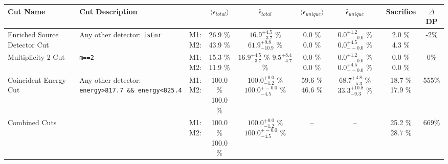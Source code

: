 \small
\begin{tabular}{|>{\raggedright}m{3cm}|m{6cm}|c c c|c c|c|c|}
\hline
  Cut Name & Cut Description &   & $\langle\epsilon_{total}\rangle$ & $\hat{\epsilon}_{total}$ & $\langle\epsilon_{unique}\rangle$ & $\hat{\epsilon}_{unique}$ & Sacrifice & $\Delta$DP \\
\hline
  Enriched Source Detector Cut & \tiny Any other detector: \texttt{isEnr} & \makecell{M1: \\ M2:} & \makecell{26.9 \% \\ 43.9 \%} & \makecell{$16.9^{+4.5}_{-3.7}$ \% \\ $61.9^{+9.8}_{-10.9}$ \%} & \makecell{0.0 \% \\ 0.0 \%} & \makecell{$0.0^{+1.2}_{--0.0}$ \% \\ $0.0^{+4.5}_{--0.0}$ \%} & \makecell{2.0 \% \\ 4.3 \%} & -2\% \\
  Multiplicity 2 Cut & \tiny  \texttt{m==2} & \makecell{M1: \\ M2:} & \makecell{15.3 \% \\ 11.9 \%} & \makecell{$16.9^{+4.5}_{-3.7}$ \% \\ $9.5^{+8.4}_{-4.7}$ \%} & \makecell{0.0 \% \\ 0.0 \%} & \makecell{$0.0^{+1.2}_{--0.0}$ \% \\ $0.0^{+4.5}_{--0.0}$ \%} & \makecell{0.0 \% \\ 0.0 \%} & 0\% \\
  Coincident Energy Cut & \tiny Any other detector: \texttt{energy>817.7 \&\& energy<825.4} & \makecell{M1: \\ M2:} & \makecell{100.0 \% \\ 100.0 \%} & \makecell{$100.0^{+0.0}_{-1.2}$ \% \\ $100.0^{+-0.0}_{-4.5}$ \%} & \makecell{59.6 \% \\ 46.6 \%} & \makecell{$68.7^{+4.8}_{-5.3}$ \% \\ $33.3^{+10.8}_{-9.3}$ \%} & \makecell{18.7 \% \\ 17.9 \%} & 555\% \\
  Combined Cuts &  & \makecell{M1: \\ M2:} & \makecell{100.0 \% \\ 100.0 \%} & \makecell{$100.0^{+0.0}_{-1.2}$ \% \\ $100.0^{+-0.0}_{-4.5}$ \%} & -- & -- & \makecell{25.2 \% \\ 28.7 \%} & 669\% \\
\hline
\end{tabular}
